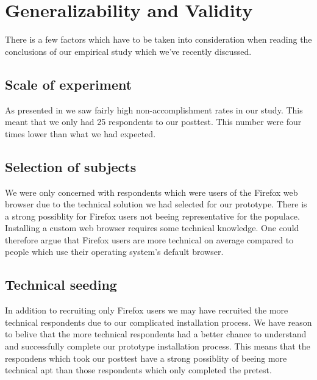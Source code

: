 \section{Generalizability and Validity}

There is a few factors which have to be taken into consideration when reading
the conclusions of our empirical study which we've recently discussed.

\subsection{Scale of experiment}

As presented in 
we saw fairly high non-accomplishment rates in our study. This meant
that we only had 25 respondents to our posttest. This number were four times
lower than what we had expected.%

\subsection{Selection of subjects}

We were only
concerned with respondents which were users of the Firefox web browser
due to the technical solution we had selected for our prototype.
There is a strong possiblity for Firefox users not beeing representative for
the \urort{} populace. Installing a custom web browser%
requires some technical knowledge. One could therefore argue that Firefox
users are more technical on average compared to people which use their
operating system's default browser.

\subsection{Technical seeding}

In addition to recruiting only Firefox users we may have recruited the more
technical respondents due to our complicated installation process. We have
reason to belive that the more technical respondents had a better chance to
understand and successfully complete our prototype installation process. This
means that the respondens which took our posttest have a strong possiblity of
beeing more technical apt than those respondents which only completed the
pretest.

